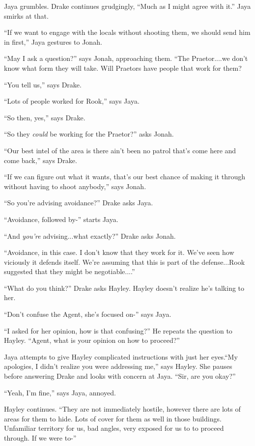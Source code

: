 Jaya grumbles.  Drake continues grudgingly, ``Much as I might agree with it.''  Jaya smirks at that.

``If we want to engage with the locals without shooting them, we should send him in first,'' Jaya gestures to Jonah.

``May I ask a question?'' says Jonah, approaching them.  ``The Praetor....we don't know what form they will take.  Will Praetors have people that work for them?

``You tell us,'' says Drake.

``Lots of people worked for Rook,'' says Jaya.

``So then, yes,'' says Drake.

``So they \textit{could} be working for the Praetor?'' asks Jonah.

``Our best intel of the area is there ain't been no patrol that's come here and come back,'' says Drake.

``If we can figure out what it wants, that's our best chance of making it through without having to shoot anybody,'' says Jonah. 

``So you're advising avoidance?'' Drake asks Jaya.

``Avoidance, followed by-'' starts Jaya.

``And \textit{you're} advising...what exactly?'' Drake asks Jonah.

``Avoidance, in this case.  I don't know that they work for it. We've seen how viciously it defends itself.  We're assuming that this is part of the defense...Rook suggested that they might be negotiable....'' 

``What do you think?'' Drake asks Hayley.  Hayley doesn't realize he's talking to her.

``Don't confuse the Agent, she's focused on-'' says Jaya.

``I asked for her opinion, how is that confusing?''  He repeats the question to Hayley.  ``Agent, what is your opinion on how to proceed?''

Jaya attempts to give Hayley complicated instructions with just her eyes.``My apologies, I didn't realize you were addressing me,'' says Hayley.  She pauses before answering Drake and looks with concern at Jaya.  ``Sir, are you okay?''

``Yeah, I'm fine,'' says Jaya, annoyed.

Hayley continues.  ``They are not immediately hostile, however there are lots of areas for them to hide.  Lots of cover for them as well in those buildings.  Unfamiliar territory for us, bad angles, very exposed for us to to proceed through.  If we were to-''


